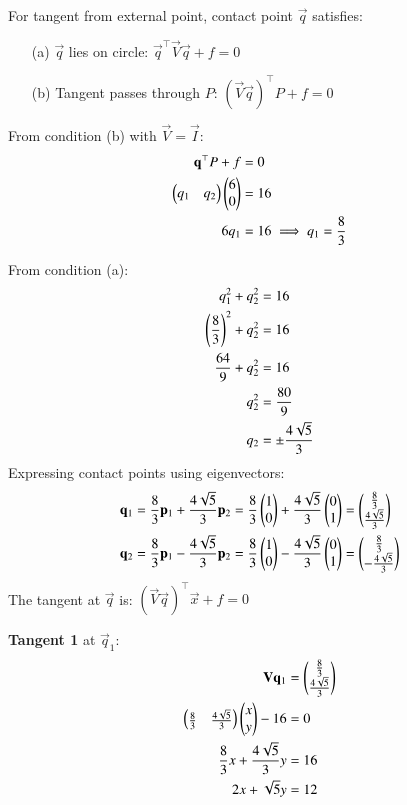 \documentclass[article]{IEEEtran}
\begin{document}
	For tangent from external point, contact point $\vec{q}$ satisfies:
	\begin{enumerate}
		\item[(a)] $\vec{q}$ lies on circle: $\vec{q}^\top\vec{V}\vec{q} + f = 0$
		\item[(b)] Tangent passes through $P$: $(\vec{V}\vec{q})^\top P + f = 0$
	\end{enumerate}
	
	From condition (b) with $\vec{V} = \vec{I}$:
	\begin{align}
		\mathbf{q}^\top P + f &= 0\\
		\begin{pmatrix}q_1 & q_2\end{pmatrix}\begin{pmatrix}6\\0\end{pmatrix} &= 16\\
		6q_1 &= 16 \implies q_1 = \frac{8}{3}
	\end{align}
	
	From condition (a):
	\begin{align}
		q_1^2 + q_2^2 &= 16\\
		\left(\frac{8}{3}\right)^2 + q_2^2 &= 16\\
		\frac{64}{9} + q_2^2 &= 16\\
		q_2^2 &= \frac{80}{9}\\
		q_2 &= \pm\frac{4\sqrt{5}}{3}
	\end{align}
Expressing contact points using eigenvectors:
	\begin{align}
		\mathbf{q}_1 &= \frac{8}{3}\mathbf{p}_1 + \frac{4\sqrt{5}}{3}\mathbf{p}_2 = \frac{8}{3}\begin{pmatrix}1\\0\end{pmatrix} + \frac{4\sqrt{5}}{3}\begin{pmatrix}0\\1\end{pmatrix} = \begin{pmatrix}\frac{8}{3}\\\frac{4\sqrt{5}}{3}\end{pmatrix}\\
		\mathbf{q}_2 &= \frac{8}{3}\mathbf{p}_1 - \frac{4\sqrt{5}}{3}\mathbf{p}_2 = \frac{8}{3}\begin{pmatrix}1\\0\end{pmatrix} - \frac{4\sqrt{5}}{3}\begin{pmatrix}0\\1\end{pmatrix} = \begin{pmatrix}\frac{8}{3}\\-\frac{4\sqrt{5}}{3}\end{pmatrix}
	\end{align}
	The tangent at $\vec{q}$ is: $(\vec{V}\vec{q})^\top \vec{x} + f = 0$
	
	\textbf{Tangent 1} at $\vec{q}_1$:
	\begin{align}
		\mathbf{V}\mathbf{q}_1 &= \begin{pmatrix}\frac{8}{3}\\\frac{4\sqrt{5}}{3}\end{pmatrix}\\
		\begin{pmatrix}\frac{8}{3} & \frac{4\sqrt{5}}{3}\end{pmatrix}\begin{pmatrix}x\\y\end{pmatrix} - 16 &= 0\\
		\frac{8}{3}x + \frac{4\sqrt{5}}{3}y &= 16\\
		2x + \sqrt{5}y &= 12
	\end{align}
	
\end{document}
